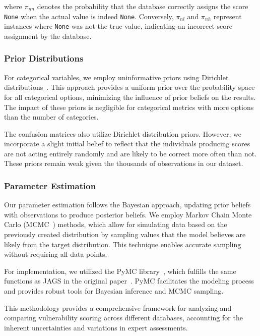 \documentclass[12pt]{article}
\begin{document}
where $\pi_{nn}$ denotes the probability that the database correctly assigns the score \texttt{None}
when the actual value is indeed \texttt{None}. Conversely, $\pi_{nl}$ and $\pi_{nh}$ represent
instances where \texttt{None} was not the true value, indicating an incorrect score assignment by
the database.

\subsubsection{Prior Distributions}

For categorical variables, we employ uninformative priors using Dirichlet distributions~\cite{dirichlet}. This
approach provides a uniform prior over the probability space for all categorical options, minimizing
the influence of prior beliefs on the results. The impact of these priors is negligible for
categorical metrics with more options than the number of categories.

The confusion matrices also utilize Dirichlet distribution priors. However, we incorporate a slight
initial belief to reflect that the individuals producing scores are not acting entirely randomly and
are likely to be correct more often than not. These priors remain weak given the thousands of
observations in our dataset.

\subsubsection{Parameter Estimation}

Our parameter estimation follows the Bayesian approach, updating prior beliefs with observations to
produce posterior beliefs. We employ Markov Chain Monte Carlo (MCMC~\cite{mcmc}) methods, which allow for
simulating data based on the previously created distribution by sampling values that the model
believes are likely from the target distribution. This technique enables accurate sampling without
requiring all data points.

For implementation, we utilized the PyMC library~\cite{pymc}, which fulfills the same functions as
JAGS in the original paper~\cite{bayes}. PyMC facilitates the modeling process and provides robust
tools for Bayesian inference and MCMC sampling.

This methodology provides a comprehensive framework for analyzing and comparing vulnerability
scoring across different databases, accounting for the inherent uncertainties and variations in
expert assessments.
\end{document}
